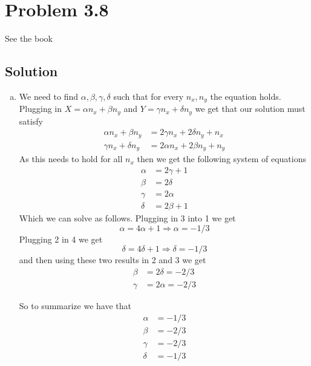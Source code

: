 \documentclass[11pt]{article}
\begin{document}
\section*{Problem 3.8}
See the book
\subsection*{Solution}
\begin{enumerate}[a)]
    \item 
    We need to find $\alpha, \beta, \gamma, \delta$ such that for every $n_x, n_y$ the equation holds. 
    Plugging in $X = \alpha n_x + \beta n_y$ and $Y = \gamma n_x + \delta n_y$ we get that our solution must satisfy
    \begin{align*}
        \alpha n_x + \beta n_y &=  2 \gamma n_x + 2 \delta n_y  + n_x \\
        \gamma n_x + \delta n_y &=  2 \alpha n_x + 2 \beta n_y  + n_y
    \end{align*}
    As this needs to hold for all $n_x$ then we get the following system of equations
    \begin{align*}
        \alpha &= 2 \gamma + 1 \\
        \beta &= 2 \delta \\
        \gamma &= 2 \alpha \\
        \delta &= 2 \beta + 1
    \end{align*}
    Which we can solve as follows. Plugging in 3 into  1 we get 
    \[ \alpha = 4 \alpha + 1 \Rightarrow \alpha = -1/3\]
    Plugging 2 in 4 we get
    \[ \delta = 4 \delta + 1 \Rightarrow \delta = -1/3\]
    and then using these two results in 2 and 3 we get
    \begin{align*}
        \beta &= 2 \delta = -2/3 \\
        \gamma &= 2 \alpha = -2/3
    \end{align*}

    So to summarize we have that
    \begin{align}
        \alpha &= -1/3 \\
        \beta &= -2/3 \\
        \gamma &= -2/3 \\
        \delta &= -1/3
    \end{align}
\end{enumerate}

\end{document}
